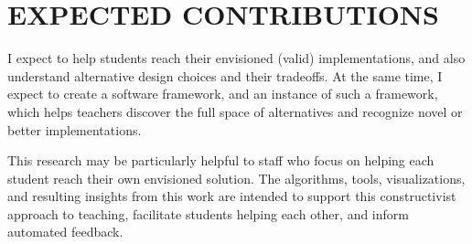 \documentclass[12pt]{article}
\begin{document}
%

\section{EXPECTED CONTRIBUTIONS}

I expect to help students reach their envisioned (valid) implementations, and also understand alternative design choices and their tradeoffs. At the same time, I expect to create a software framework, and an instance of such a framework, which helps teachers discover the full space of alternatives and recognize novel or better implementations.


This research may be particularly helpful to staff who focus on helping each student reach their own envisioned solution. The algorithms, tools, visualizations, and resulting insights from this work are intended to support this constructivist approach to teaching, facilitate students helping each other, and inform automated feedback.
\end{document}
